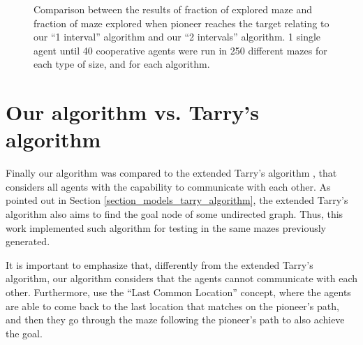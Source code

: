 \begin{figure}
    \centering
    \qquad
    \qquad
    \newline
    \qquad
    \qquad
    \newline
    \qquad
    \caption{Comparison between the results of fraction of explored maze and fraction of maze explored when pioneer reaches the target relating to our ``1 interval'' algorithm and our ``2 intervals'' algorithm. 1 single agent until 40 cooperative agents were run in 250 different mazes for each type of size, and for each algorithm.}
    \label{our_algorithm_1I_vs_2I_fraction}
\end{figure}

\section{Our algorithm vs. Tarry's algorithm}
\label{section_results_tarry_vs_our}

Finally our algorithm was compared to the extended Tarry's algorithm \cite{KivelevitchCohen2010}, that considers all agents with the capability to communicate with each other. As pointed out in Section \ref{section_models_tarry_algorithm}, the extended Tarry's algorithm also aims to find the goal node of some undirected graph. Thus, this work implemented such algorithm for testing in the same mazes previously generated.

It is important to emphasize that, differently from the extended Tarry's algorithm, our algorithm considers that the agents cannot communicate with each other. Furthermore,  use the ``Last Common Location'' concept, where the agents are able to come back to the last location that matches on the pioneer's path, and then they go through the maze following the pioneer's path to also achieve the goal.

